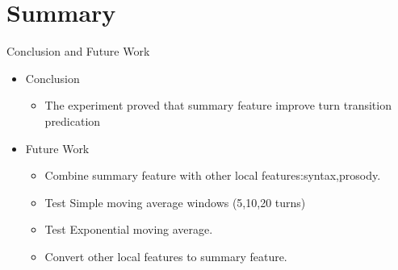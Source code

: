 \section{Summary}
\frame{\sectionpage}


\begin{frame}{Conclusion and Future Work}
  \begin{itemize}
     \item Conclusion
       \begin{itemize}
          \item The experiment proved that summary feature improve turn transition predication
       \end{itemize}
  \item Future Work
     \begin{itemize}
        \item Combine summary feature with other local features:syntax,prosody.
        \item Test Simple moving average windows (5,10,20 turns)
        \item Test Exponential moving average.
        \item Convert other local features to summary feature.
     \end{itemize}
  \end{itemize}
\end{frame}



